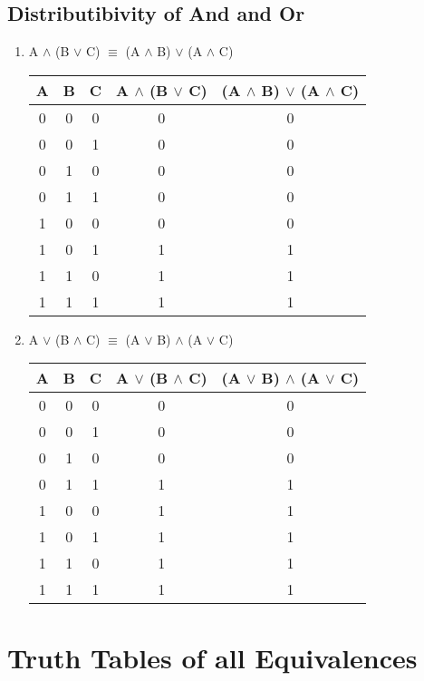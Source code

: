 \documentclass{report}
\begin{document}
\section{Distributibivity of And and Or}
\begin{enumerate}

  \item A $\land$ (B $\lor$ C) $\equiv$ (A $\land$ B) $\lor$ (A $\land$ C)

\begin{center}
  \begin{tabular}{| c | c | c | c | c |}
    \hline
    A & B & C & A $\land$ (B $\lor$ C) & (A $\land$ B) $\lor$ (A $\land$ C) \\ \hline
    0 & 0 & 0 & 0 & 0 \\
    0 & 0 & 1 & 0 & 0 \\
    0 & 1 & 0 & 0 & 0 \\
    0 & 1 & 1 & 0 & 0 \\
    1 & 0 & 0 & 0 & 0 \\
    1 & 0 & 1 & 1 & 1 \\
    1 & 1 & 0 & 1 & 1 \\
    1 & 1 & 1 & 1 & 1 \\ \hline
  \end{tabular}
\end{center}

  \item A $\lor$ (B $\land$ C) $\equiv$ (A $\lor$ B) $\land$ (A $\lor$ C)

\begin{center}
  \begin{tabular}{| c | c | c | c | c |}
    \hline
    A & B & C & A $\lor$ (B $\land$ C) & (A $\lor$ B) $\land$ (A $\lor$ C) \\ \hline
    0 & 0 & 0 & 0 & 0 \\
    0 & 0 & 1 & 0 & 0 \\
    0 & 1 & 0 & 0 & 0 \\
    0 & 1 & 1 & 1 & 1 \\
    1 & 0 & 0 & 1 & 1 \\
    1 & 0 & 1 & 1 & 1 \\
    1 & 1 & 0 & 1 & 1 \\
    1 & 1 & 1 & 1 & 1 \\ \hline
  \end{tabular}
\end{center}
\end{enumerate}
\chapter{Truth Tables of all Equivalences}
\end{document}
